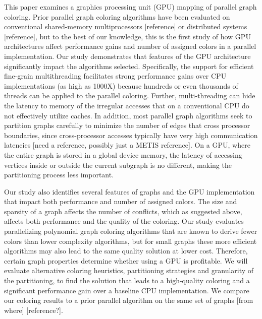 \documentclass[preprint]{sigplanconf}
\begin{document}
This paper examines a graphics processing unit (GPU) mapping of parallel graph coloring.  Prior parallel graph coloring algorithms have been evaluated on conventional shared-memory multiprocessors [reference] or distributed systems [reference], but to the best of our knowledge, this is the first study of how GPU architectures affect performance gains and number of assigned colors in a parallel implementation.  Our study demonstrates that features of the GPU architecture significantly impact the algorithms selected.  Specifically, the support for efficient fine-grain multithreading facilitates strong performance gains over CPU implementations (as high as 1000X) because hundreds or even thousands of threads can be applied to the parallel coloring.  Further, multi-threading can hide the latency to memory of the irregular accesses that on a conventional CPU do not effectively utilize caches.  In addition, most parallel graph algorithms seek to partition graphs carefully to minimize the number of edges that cross processor boundaries, since cross-processor accesses typically have very high communication latencies [need a reference, possibly just a METIS reference].  On a GPU, where the entire graph is stored in a global device memory, the latency of accessing vertices inside or outside the current subgraph is no different, making the partitioning process less important. 

Our study also identifies several features of graphs and the GPU implementation that impact both performance and number of assigned colors.  The size and sparsity of a graph affects the number of conflicts, which as suggested above, affects both performance and the quality of the coloring.  Our study evaluates parallelizing polynomial graph coloring algorithms that are known to derive fewer colors than lower complexity algorithms, but for small graphs these more efficient algorithms may also lead to the same quality solution at lower cost.  Therefore, certain graph properties determine whether using a GPU is profitable.  We will evaluate alternative coloring heuristics, partitioning strategies and granularity of the partitioning, to find the solution that leads to a high-quality coloring and a significant performance gain over a baseline CPU implementation.  We compare our coloring results to a prior parallel algorithm on the same set of graphs [from where] [reference?].

\end{document}
